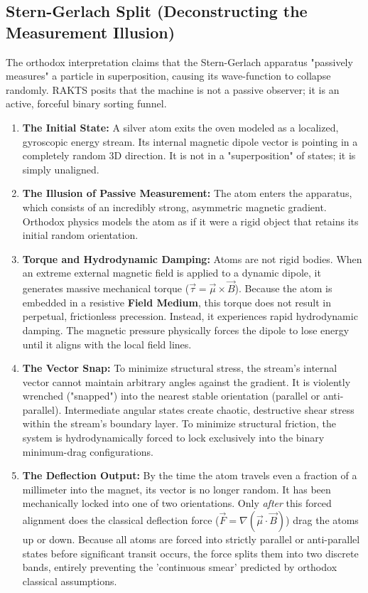 \documentclass[reprint,amsmath,amssymb,aps,prd,twocolumn]{revtex4-2}
\begin{document}
\subsection{Stern-Gerlach Split (Deconstructing the Measurement Illusion)}
The orthodox interpretation claims that the Stern-Gerlach apparatus "passively measures" a particle in superposition, causing its wave-function to collapse randomly. RAKTS posits that the machine is not a passive observer; it is an active, forceful binary sorting funnel.

\begin{enumerate}
    \item \textbf{The Initial State:} A silver atom exits the oven modeled as a localized, gyroscopic energy stream. Its internal magnetic dipole vector is pointing in a completely random 3D direction. It is not in a "superposition" of states; it is simply unaligned.
    \item \textbf{The Illusion of Passive Measurement:} The atom enters the apparatus, which consists of an incredibly strong, asymmetric magnetic gradient. Orthodox physics models the atom as if it were a rigid object that retains its initial random orientation.
    \item \textbf{Torque and Hydrodynamic Damping:} Atoms are not rigid bodies. When an extreme external magnetic field is applied to a dynamic dipole, it generates massive mechanical torque ($\vec{\tau} = \vec{\mu} \times \vec{B}$). Because the atom is embedded in a resistive \textbf{Field Medium}, this torque does not result in perpetual, frictionless precession. Instead, it experiences rapid hydrodynamic damping. The magnetic pressure physically forces the dipole to lose energy until it aligns with the local field lines.
    \item \textbf{The Vector Snap:} To minimize structural stress, the stream's internal vector cannot maintain arbitrary angles against the gradient. It is violently wrenched ("snapped") into the nearest stable orientation (parallel or anti-parallel). Intermediate angular states create chaotic, destructive shear stress within the stream's boundary layer. To minimize structural friction, the system is hydrodynamically forced to lock exclusively into the binary minimum-drag configurations.
    \item \textbf{The Deflection Output:} By the time the atom travels even a fraction of a millimeter into the magnet, its vector is no longer random. It has been mechanically locked into one of two orientations. Only \textit{after} this forced alignment does the classical deflection force ($\vec{F} = \nabla(\vec{\mu} \cdot \vec{B})$) drag the atoms up or down. Because all atoms are forced into strictly parallel or anti-parallel states before significant transit occurs, the force splits them into two discrete bands, entirely preventing the 'continuous smear' predicted by orthodox classical assumptions.
\end{enumerate}
\end{document}
